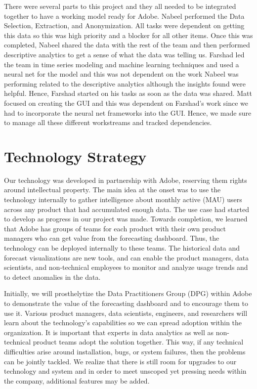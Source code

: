 \documentclass[11pt, oneside]{report}
\begin{document}
There were several parts to this project and they all needed to be integrated together to have a working model ready for Adobe. Nabeel performed the Data Selection, Extraction, and Anonymization. All tasks were dependent on getting this data so this was high priority and a blocker for all other items. Once this was completed, Nabeel shared the data with the rest of the team and then performed descriptive analytics to get a sense of what the data was telling us. Farshad led the team in time series modeling and machine learning techniques and used a neural net for the model and this was not dependent on the work Nabeel was performing related to the descriptive analytics although the insights found were helpful. Hence, Farshad started on his tasks as soon as the data was shared. Matt focused on creating the GUI and this was dependent on Farshad's work since we had to incorporate the neural net frameworks into the GUI. Hence, we made sure to manage all these different workstreams and tracked dependencies.

\section{Technology Strategy}
Our technology was developed in partnership with Adobe, reserving them rights around intellectual property. The main idea at the onset was to use the technology internally to gather intelligence about monthly active (MAU) users across any product that had accumulated enough data. The use case had started to develop as progress in our project was made. Towards completion, we learned that Adobe has groups of teams for each product with their own product managers who can get value from the forecasting dashboard. Thus, the technology can be deployed internally to these teams. The historical data and forecast visualizations are new tools, and can enable the product managers, data scientists, and non-technical employees to monitor and analyze usage trends and to detect anomalies in the data.

Initially, we will prosthelytize the Data Practitioners Group (DPG) within Adobe to demonstrate the value of the forecasting dashboard and to encourage them to use it. Various product managers, data scientists, engineers, and researchers will learn about the technology's capabilities so we can spread adoption within the organization. It is important that experts in data analytics as well as non-technical product teams adopt the solution together. This way, if any technical difficulties arise around installation, bugs, or system failures, then the problems can be jointly tackled. We realize that there is still room for upgrades to our technology and system and in order to meet unscoped yet pressing needs within the company, additional features may be added.
\end{document}
